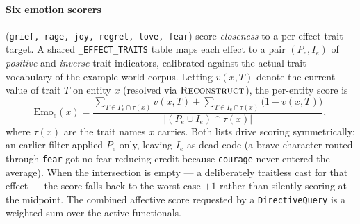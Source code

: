 \documentclass[11pt]{article}
\begin{document}
\paragraph{Six emotion scorers} (\texttt{grief, rage, joy, regret,
love, fear}) score \emph{closeness} to a per-effect trait target.
A shared \texttt{\_EFFECT\_TRAITS} table maps each effect to a
pair $(P_e, I_e)$ of \emph{positive} and \emph{inverse} trait
indicators, calibrated against the actual trait vocabulary of the
example-world corpus. Letting $v(x, T)$ denote the current value
of trait $T$ on entity $x$ (resolved via $\textsc{Reconstruct}$),
the per-entity score is
\begin{equation}
\label{eq:emotion}
\mathrm{Emo}_e(x) =
\frac{\sum_{T \in P_e \cap \tau(x)} v(x, T) +
      \sum_{T \in I_e \cap \tau(x)} \bigl(1 - v(x, T)\bigr)}
     {|(P_e \cup I_e) \cap \tau(x)|},
\end{equation}
where $\tau(x)$ are the trait names $x$ carries. Both lists drive
scoring symmetrically: an earlier filter applied $P_e$ only,
leaving $I_e$ as dead code (a brave character routed through
\texttt{fear} got no fear-reducing credit because
\texttt{courage} never entered the average). When the
intersection is empty --- a deliberately traitless cast for that
effect --- the score falls back to the worst-case $+1$ rather
than silently scoring at the midpoint. The combined affective
score requested by a \texttt{DirectiveQuery} is a weighted sum
over the active functionals.
\end{document}
